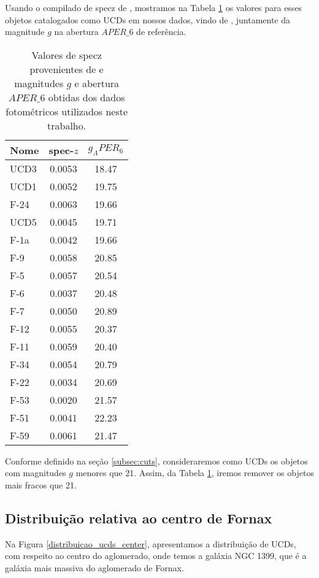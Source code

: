 Usando o compilado de \ac{specz} de \cite{Lima_2024}, mostramos na Tabela \ref{tab:ucds_know_z_gmag} os valores para esses objetos catalogados como UCDs em nossos dados, vindo de \cite{catalog_ucds}, juntamente da magnitude $g$ na abertura $APER\_6$ de referência. 

\begin{table}[!ht]
    \centering
    \caption{Valores de \ac{specz} provenientes de \cite{Lima_2024} e magnitudes $g$ e abertura $APER\_6$ obtidas dos dados fotométricos utilizados neste trabalho.}
    \begin{tabular}{lcc}
        \toprule
        Nome & spec-$z$ & $g_APER_6$ \\
        \midrule
        UCD3 & 0.0053 & 18.47\\
        UCD1 & 0.0052 & 19.75\\
        F-24 & 0.0063 & 19.66\\
        UCD5 & 0.0045 & 19.71\\
        F-1a & 0.0042 & 19.66\\
        F-9  & 0.0058 & 20.85\\
        F-5  & 0.0057 & 20.54\\
        F-6  & 0.0037 & 20.48\\
        F-7  & 0.0050 & 20.89\\
        F-12 & 0.0055 & 20.37\\
        F-11 & 0.0059 & 20.40\\
        F-34 & 0.0054 & 20.79\\
        F-22 & 0.0034 & 20.69\\
        F-53 & 0.0020 & 21.57\\
        F-51 & 0.0041 & 22.23\\
        F-59 & 0.0061 & 21.47\\
        \bottomrule
    \end{tabular}
    \label{tab:ucds_know_z_gmag}
\end{table}

Conforme definido na seção \ref{subsec:cuts}, consideraremos como UCDs os objetos com magnitudes $g$ menores que 21. Assim, da Tabela \ref{tab:ucds_know_z_gmag}, iremos remover os objetos mais fracos que 21.

\subsection{Distribuição relativa ao centro de Fornax}
Na Figura \ref{distribuicao_ucds_center}, apresentamos a distribuição de UCDs, com respeito ao centro do aglomerado, onde temos a galáxia NGC 1399, que é a galáxia mais massiva do aglomerado de Fornax.

